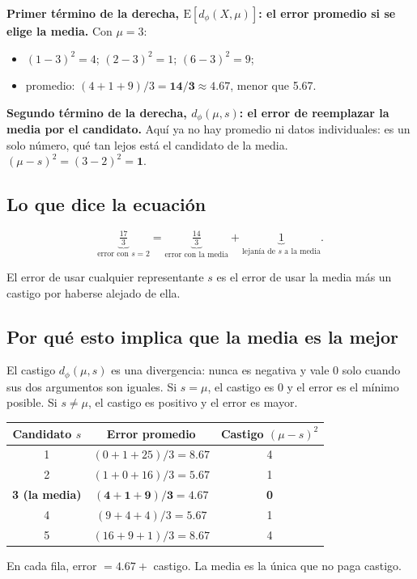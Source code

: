 \documentclass[11pt,a4paper]{article}
\newenvironment{idea}{\par\begin{center}\begin{lrbox}{\ideabox}\begin{minipage}{0.9\linewidth}}{\end{minipage}\end{lrbox}\fcolorbox{blue!40!black}{blue!5}{\usebox{\ideabox}}\end{center}}
\begin{document}
\textbf{Primer término de la derecha, $\mathrm{E}[d_\phi(X,\mu)]$: el error
promedio si se elige la media.} Con $\mu=3$:
\begin{itemize}
  \item $(1-3)^2=4$; $(2-3)^2=1$; $(6-3)^2=9$;
  \item promedio: $(4+1+9)/3=\mathbf{14/3\approx 4.67}$, menor que 5.67.
\end{itemize}

\textbf{Segundo término de la derecha, $d_\phi(\mu,s)$: el error de reemplazar la
media por el candidato.} Aquí ya no hay promedio ni datos individuales: es un solo
número, qué tan lejos está el candidato de la media. $(\mu-s)^2=(3-2)^2=\mathbf{1}$.

\subsection{Lo que dice la ecuación}

\[
  \underbrace{\tfrac{17}{3}}_{\text{error con } s=2}
  =\underbrace{\tfrac{14}{3}}_{\text{error con la media}}
  +\underbrace{1}_{\text{lejanía de } s \text{ a la media}}.
\]
\begin{idea}
El error de usar cualquier representante $s$ es el error de usar la media más un
castigo por haberse alejado de ella.
\end{idea}

\subsection{Por qué esto implica que la media es la mejor}

El castigo $d_\phi(\mu,s)$ es una divergencia: nunca es negativa y vale 0 solo
cuando sus dos argumentos son iguales. Si $s=\mu$, el castigo es 0 y el error es
el mínimo posible. Si $s\neq\mu$, el castigo es positivo y el error es mayor.

\begin{center}
\begin{tabular}{ccc}
\toprule
Candidato $s$ & Error promedio & Castigo $(\mu-s)^2$ \\
\midrule
1 & $(0+1+25)/3=8.67$ & 4 \\
2 & $(1+0+16)/3=5.67$ & 1 \\
\textbf{3 (la media)} & $\mathbf{(4+1+9)/3=4.67}$ & \textbf{0} \\
4 & $(9+4+4)/3=5.67$ & 1 \\
5 & $(16+9+1)/3=8.67$ & 4 \\
\bottomrule
\end{tabular}
\end{center}
En cada fila, error $=4.67+$ castigo. La media es la única que no paga castigo.
\end{document}
